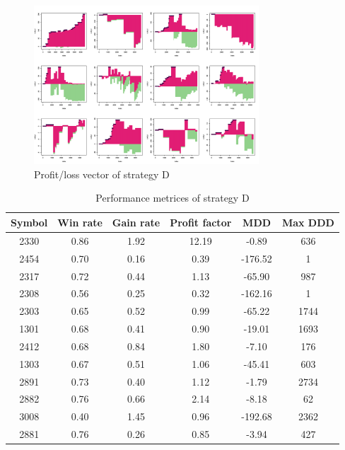 \documentclass[12pt, letterpaper, oneside]{article}
\begin{document}
\begin{figure}[h]
    \centering
    \includegraphics[width=0.75\textwidth]{sd_pl}
    \caption{Profit/loss vector of strategy D}
    \label{fig:d}
\end{figure}

\begin{table}[h!]
    \centering
    \begin{tabular}{ |c|c|c|c|c|c| }
        \hline
        Symbol & Win rate & Gain rate & Profit factor & MDD & Max DDD \\ [0.5ex]
        \hline
        2330 & 0.86 & 1.92 & 12.19 & -0.89 & 636 \\
        2454 & 0.70 & 0.16 & 0.39 & -176.52 & 1 \\
        2317 & 0.72 & 0.44 & 1.13 & -65.90 & 987 \\
        2308 & 0.56 & 0.25 & 0.32 & -162.16 & 1 \\
        2303 & 0.65 & 0.52 & 0.99 & -65.22 & 1744 \\
        1301 & 0.68 & 0.41 & 0.90 & -19.01 & 1693 \\
        2412 & 0.68 & 0.84 & 1.80 & -7.10 & 176 \\
        1303 & 0.67 & 0.51 & 1.06 & -45.41 & 603 \\
        2891 & 0.73 & 0.40 & 1.12 & -1.79 & 2734 \\
        2882 & 0.76 & 0.66 & 2.14 & -8.18 & 62 \\
        3008 & 0.40 & 1.45 & 0.96 & -192.68 & 2362 \\
        2881 & 0.76 & 0.26 & 0.85 & -3.94 & 427 \\ [0.5ex]
        \hline
    \end{tabular}
    \caption{Performance metrices of strategy D}
    \label{table:d}
\end{table}
\end{document}
